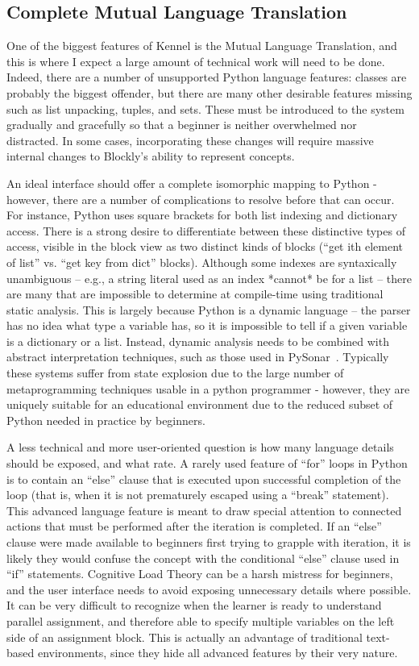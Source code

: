 \subsection{Complete Mutual Language Translation}

One of the biggest features of Kennel is the Mutual Language Translation, and this is where I expect a large amount of technical work will need to be done.
Indeed, there are a number of unsupported Python language features: classes are probably the biggest offender, but there are many other desirable features missing such as list unpacking, tuples, and sets.
These must be introduced to the system gradually and gracefully so that a beginner is neither overwhelmed nor distracted.
In some cases, incorporating these changes will require massive internal changes to Blockly's ability to represent concepts.

An ideal interface should offer a complete isomorphic mapping to Python - however, there are a number of complications to resolve before that can occur.
For instance, Python uses square brackets for both list indexing and dictionary access.
There is a strong desire to differentiate between these distinctive types of access, visible in the block view as two distinct kinds of blocks (``get ith element of list'' vs. ``get key from dict'' blocks).
Although some indexes are syntaxically unambiguous -- e.g., a string literal used as an index *cannot* be for a list -- there are many that are impossible to determine at compile-time using traditional static analysis.
This is largely because Python is a dynamic language -- the parser has no idea what type a variable has, so it is impossible to tell if a given variable is a dictionary or a list.
Instead, dynamic analysis needs to be combined with abstract interpretation techniques, such as those used in PySonar~\cite{PySonar}.
Typically these systems suffer from state explosion due to the large number of metaprogramming techniques usable in a python programmer - however, they are uniquely suitable for an educational environment due to the reduced subset of Python needed in practice by beginners.

A less technical and more user-oriented question is how many language details should be exposed, and what rate.
A rarely used feature of ``for'' loops in Python is to contain an ``else'' clause that is executed upon successful completion of the loop (that is, when it is not prematurely escaped using a ``break'' statement).
This advanced language feature is meant to draw special attention to connected actions that must be performed after the iteration is completed.
If an ``else'' clause were made available to beginners first trying to grapple with iteration, it is likely they would confuse the concept with the conditional ``else'' clause used in ``if'' statements.
Cognitive Load Theory can be a harsh mistress for beginners, and the user interface needs to avoid exposing unnecessary details where possible.
It can be very difficult to recognize when the learner is ready to understand parallel assignment, and therefore able to specify multiple variables on the left side of an assignment block.
This is actually an advantage of traditional text-based environments, since they hide all advanced features by their very nature.


